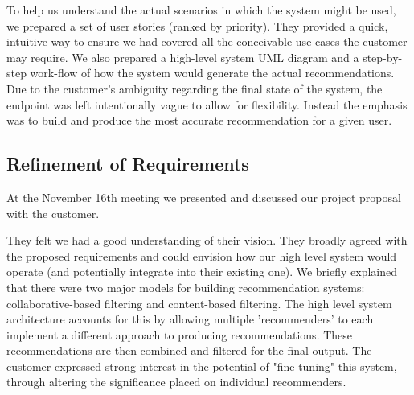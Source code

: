 \documentclass{l3proj}
\begin{document}
To help us understand the actual scenarios in which the system might be used, we prepared a set of user stories (ranked by priority). They provided a quick, intuitive way to ensure we had covered all the conceivable use cases the customer may require. We also prepared a high-level system UML diagram and a step-by-step work-flow of how the system would generate the actual recommendations. Due to the customer's ambiguity regarding the final state of the system, the endpoint was left intentionally vague to allow for flexibility. Instead the emphasis was to build and produce the most accurate recommendation for a given user. 


\subsection{Refinement of Requirements}
\label{sec:custrefineinitobj}


At the November 16th meeting we presented and discussed our project proposal with the customer.

They felt we had a good understanding of their vision. They broadly agreed with the proposed requirements and could envision how our high level system would operate (and potentially integrate into their existing one). We briefly explained that there were two major models for building recommendation systems: collaborative-based filtering and content-based filtering. The high level system architecture accounts for this by allowing multiple 'recommenders' to each implement a different approach to producing recommendations. These recommendations are then combined and filtered for the final output. The customer expressed strong interest in the potential of "fine tuning" this system, through altering the significance placed on individual recommenders. 

\end{document}
